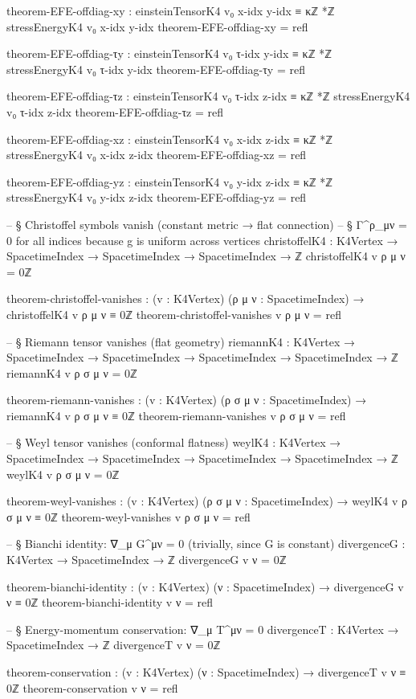 \documentclass[11pt,a4paper]{book}
\begin{document}
\begin{code}
  theorem-EFE-offdiag-xy : einsteinTensorK4 v₀ x-idx y-idx ≡ κℤ *ℤ stressEnergyK4 v₀ x-idx y-idx
  theorem-EFE-offdiag-xy = refl

  theorem-EFE-offdiag-τy : einsteinTensorK4 v₀ τ-idx y-idx ≡ κℤ *ℤ stressEnergyK4 v₀ τ-idx y-idx
  theorem-EFE-offdiag-τy = refl

  theorem-EFE-offdiag-τz : einsteinTensorK4 v₀ τ-idx z-idx ≡ κℤ *ℤ stressEnergyK4 v₀ τ-idx z-idx
  theorem-EFE-offdiag-τz = refl

  theorem-EFE-offdiag-xz : einsteinTensorK4 v₀ x-idx z-idx ≡ κℤ *ℤ stressEnergyK4 v₀ x-idx z-idx
  theorem-EFE-offdiag-xz = refl

  theorem-EFE-offdiag-yz : einsteinTensorK4 v₀ y-idx z-idx ≡ κℤ *ℤ stressEnergyK4 v₀ y-idx z-idx
  theorem-EFE-offdiag-yz = refl

-- § Christoffel symbols vanish (constant metric → flat connection)
-- § Γ^ρ_μν = 0 for all indices because g is uniform across vertices
christoffelK4 : K4Vertex → SpacetimeIndex → SpacetimeIndex → SpacetimeIndex → ℤ
christoffelK4 v ρ μ ν = 0ℤ

theorem-christoffel-vanishes : (v : K4Vertex) (ρ μ ν : SpacetimeIndex) →
  christoffelK4 v ρ μ ν ≡ 0ℤ
theorem-christoffel-vanishes v ρ μ ν = refl

-- § Riemann tensor vanishes (flat geometry)
riemannK4 : K4Vertex → SpacetimeIndex → SpacetimeIndex →
            SpacetimeIndex → SpacetimeIndex → ℤ
riemannK4 v ρ σ μ ν = 0ℤ

theorem-riemann-vanishes : (v : K4Vertex) (ρ σ μ ν : SpacetimeIndex) →
  riemannK4 v ρ σ μ ν ≡ 0ℤ
theorem-riemann-vanishes v ρ σ μ ν = refl

-- § Weyl tensor vanishes (conformal flatness)
weylK4 : K4Vertex → SpacetimeIndex → SpacetimeIndex →
         SpacetimeIndex → SpacetimeIndex → ℤ
weylK4 v ρ σ μ ν = 0ℤ

theorem-weyl-vanishes : (v : K4Vertex) (ρ σ μ ν : SpacetimeIndex) →
  weylK4 v ρ σ μ ν ≡ 0ℤ
theorem-weyl-vanishes v ρ σ μ ν = refl

-- § Bianchi identity: ∇_μ G^μν = 0 (trivially, since G is constant)
divergenceG : K4Vertex → SpacetimeIndex → ℤ
divergenceG v ν = 0ℤ

theorem-bianchi-identity : (v : K4Vertex) (ν : SpacetimeIndex) →
  divergenceG v ν ≡ 0ℤ
theorem-bianchi-identity v ν = refl

-- § Energy-momentum conservation: ∇_μ T^μν = 0
divergenceT : K4Vertex → SpacetimeIndex → ℤ
divergenceT v ν = 0ℤ

theorem-conservation : (v : K4Vertex) (ν : SpacetimeIndex) →
  divergenceT v ν ≡ 0ℤ
theorem-conservation v ν = refl


\end{code}
\end{document}
